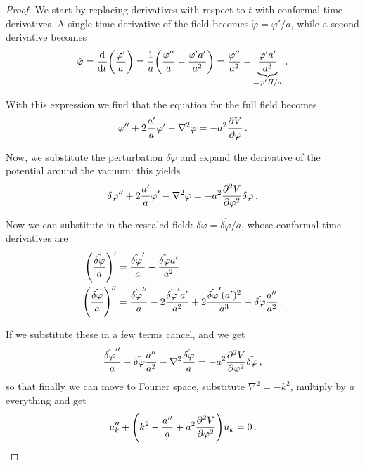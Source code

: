 \documentclass[main.tex]{subfiles}
\begin{document}
\begin{proof}
We start by replacing derivatives with respect to \(t\) with conformal time derivatives. A single time derivative of the field becomes \(\dot{\varphi} = \varphi' / a\), while a second derivative becomes
%
\begin{align}
\ddot{\varphi} = \dv{}{t} \qty(\frac{\varphi '}{a}) = \frac{1}{a} \qty(\frac{\varphi''}{a} - \frac{\varphi ' a'}{a^2}) = \frac{\varphi''}{a^2} - \underbrace{\frac{\varphi' a'}{a^3}}_{= \varphi ' H / a}
\,.
\end{align}

With this expression we find that the equation for the full field becomes 
%
\begin{align}
\varphi'' + 2 \frac{a'}{a} \varphi ' - \nabla^2 \varphi = - a^2 \pdv{V}{\varphi }
\,.
\end{align}

Now, we substitute the perturbation \(\delta \varphi \) and expand the derivative of the potential around the vacuum: this yields 
%
\begin{align}
\delta \varphi '' + 2 \frac{a'}{a} \varphi ' - \nabla^2 \varphi = - a^2 \pdv[2]{V}{\varphi } \delta \varphi 
\,.
\end{align}

Now we can substitute in the rescaled field: \(\delta \varphi = \hat{\delta \varphi } / a\), whose conformal-time derivatives are 
%
\begin{align}
\qty(\frac{ \hat{ \delta \varphi} }{a})' &= \frac{ \hat{\delta \varphi }'}{a} - \frac{\hat{\delta \varphi } a'}{a^2}  \\
\qty(\frac{\hat{\delta \varphi }}{a})'' &= \frac{\hat{\delta \varphi }''}{a} - 2 \frac{\hat{\delta \varphi }' a'}{a^2} + 2 \frac{\hat{\delta \varphi }' (a')^2}{a^3} - \hat{\delta \varphi } \frac{a''}{a^2}
\,.
\end{align}

If we substitute these in a few terms cancel, and we get 
%
\begin{align}
\frac{\hat{\delta \varphi }''}{a} - \hat{\delta \varphi } \frac{a''}{a^2}
- \nabla^2 \frac{\hat{\delta\varphi}}{a} = - a^2 \pdv[2]{V}{\varphi } \hat{\delta \varphi }
\,,
\end{align}
%
so that finally we can move to Fourier space, substitute \(\nabla^2= - k^2 \), multiply by \(a\) everything and get 
%
\begin{align}
u_k'' + \qty(k^2 - \frac{a''}{a} + a^2 \pdv[2]{V}{\varphi }) u_k = 0 
\,.
\end{align}
\end{proof}
\end{document}
